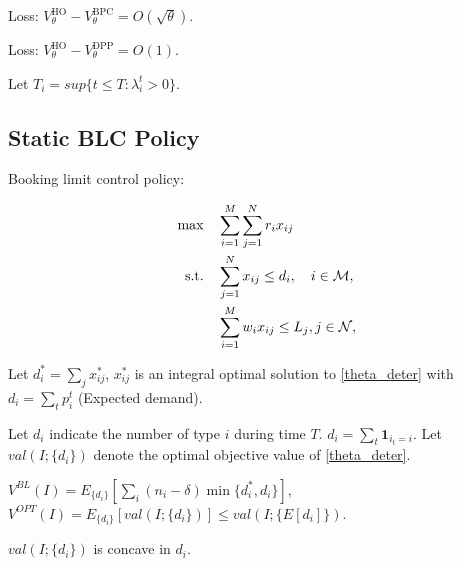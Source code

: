 \begin{lem}
    Loss: $V_{\theta}^{\text{HO}} - V_{\theta}^{\text{BPC}} = O(\sqrt{\theta})$. 
\end{lem}

\begin{lem}
    Loss: $V_{\theta}^{\text{HO}} - V_{\theta}^{\text{DPP}} = O(1)$. 
\end{lem}

Let $T_{i} = sup \{t \leq T: \lambda_{i}^{t} > 0\}$. 



\newpage

\subsection{Static BLC Policy}
Booking limit control policy:

\begin{align}
    \quad \max \quad & \sum_{i=1}^{M}  \sum_{j= 1}^{N} r_{i} x_{ij} \label{theta_deter} \\
    \text {s.t.} \quad & \sum_{j= 1}^{N} x_{ij} \leq d_{i}, \quad i \in \mathcal{M}, \notag \\ 
    & \sum_{i=1}^{M} w_{i} x_{ij} \leq L_j, j \in \mathcal{N}, \notag 
\end{align}

Let $d_{i}^{*} = \sum_{j} x_{ij}^{*}$, $x_{ij}^{*}$ is an integral optimal solution to \eqref{theta_deter} with $d_{i} = \sum_{t} p_{i}^{t}$ (Expected demand).

Let $d_{i}$ indicate the number of type $i$ during time $T$. $d_{i} = \sum_{t} \bm{1}_{i_{t} = i}$.
Let $val(I; \{d_{i}\})$ denote the optimal objective value of \eqref{theta_deter}.

$V^{BL}(I) = E_{\{d_{i}\}}[\sum_{i} (n_{i}-\delta) \min\{d_{i}^{*}, d_{i}\}]$, $V^{OPT}(I) = E_{\{d_{i}\}} [val(I; \{d_{i}\})] \leq val(I; \{E[d_{i}]\})$.

$val(I; \{d_{i}\})$ is concave in $d_{i}$.

